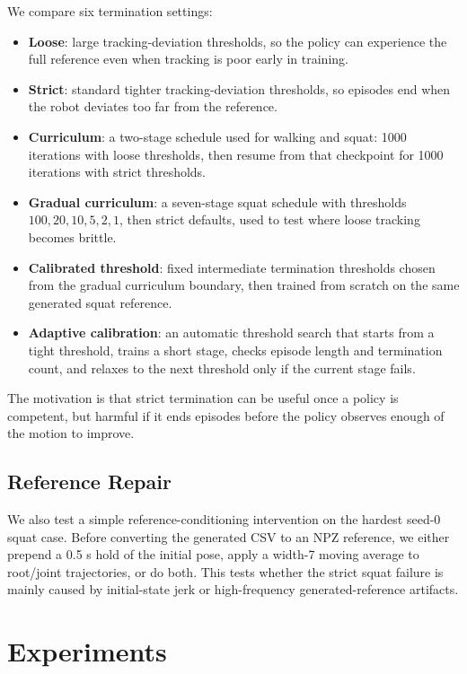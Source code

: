\documentclass[10pt]{article}
\begin{document}
We compare six termination settings:
\begin{itemize}
    \item \textbf{Loose}: large tracking-deviation thresholds, so the policy can experience the full reference even when tracking is poor early in training.
    \item \textbf{Strict}: standard tighter tracking-deviation thresholds, so episodes end when the robot deviates too far from the reference.
    \item \textbf{Curriculum}: a two-stage schedule used for walking and squat: 1000 iterations with loose thresholds, then resume from that checkpoint for 1000 iterations with strict thresholds.
    \item \textbf{Gradual curriculum}: a seven-stage squat schedule with thresholds $100, 20, 10, 5, 2, 1$, then strict defaults, used to test where loose tracking becomes brittle.
    \item \textbf{Calibrated threshold}: fixed intermediate termination thresholds chosen from the gradual curriculum boundary, then trained from scratch on the same generated squat reference.
    \item \textbf{Adaptive calibration}: an automatic threshold search that starts from a tight threshold, trains a short stage, checks episode length and termination count, and relaxes to the next threshold only if the current stage fails.
\end{itemize}

The motivation is that strict termination can be useful once a policy is competent, but harmful if it ends episodes before the policy observes enough of the motion to improve.

\subsection{Reference Repair}

We also test a simple reference-conditioning intervention on the hardest seed-0 squat case. Before converting the generated CSV to an NPZ reference, we either prepend a 0.5 s hold of the initial pose, apply a width-7 moving average to root/joint trajectories, or do both. This tests whether the strict squat failure is mainly caused by initial-state jerk or high-frequency generated-reference artifacts.

\section{Experiments}
\end{document}
